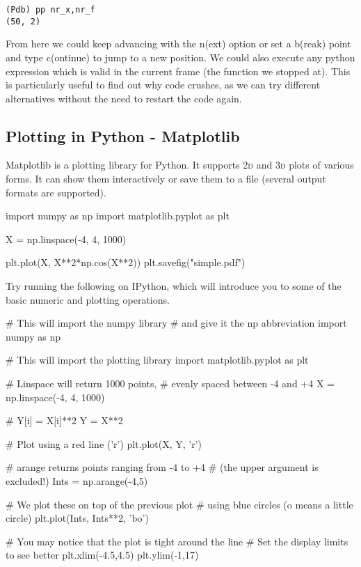 \begin{verbatim}
(Pdb) pp nr_x,nr_f
(50, 2)
\end{verbatim}

From here we could keep advancing with the n(ext) option or set a b(reak) point and type c(ontinue) to jump to a new position. We could also execute any python expression which is valid in the current frame (the function we stopped at). This is particularly useful to find out why code crushes, as we can try different alternatives without the need to restart the code again.

\subsection{Plotting in Python - Matplotlib}

Matplotlib is a plotting library for Python. It supports \textsc{2d} and
\textsc{3d} plots of various forms. It can show them interactively or save them
to a file (several output formats are supported).

\begin{python}
import numpy as np
import matplotlib.pyplot as plt

X = np.linspace(-4, 4, 1000)

plt.plot(X, X**2*np.cos(X**2))
plt.savefig("simple.pdf")
\end{python}


\begin{exercise}
Try running the following on IPython, which will introduce you to some of the basic numeric and plotting operations.

\begin{python}
# This will import the numpy library
# and give it the np abbreviation
import numpy as np

# This will import the plotting library
import matplotlib.pyplot as plt

# Linspace will return 1000 points,
# evenly spaced between -4 and +4
X = np.linspace(-4, 4, 1000)

# Y[i] = X[i]**2
Y = X**2

# Plot using a red line ('r')
plt.plot(X, Y, 'r')

# arange returns points ranging from -4 to +4
# (the upper argument is excluded!)
Ints = np.arange(-4,5)

# We plot these on top of the previous plot
# using blue circles (o means a little circle)
plt.plot(Ints, Ints**2, 'bo')

# You may notice that the plot is tight around the line
# Set the display limits to see better
plt.xlim(-4.5,4.5)
plt.ylim(-1,17)
\end{python}
\end{exercise}

